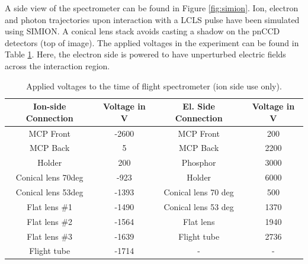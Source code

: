 A side view of the spectrometer can be found in Figure \ref{fig:simion}. Ion, electron and photon trajectories upon interaction with a LCLS pulse have been simulated using SIMION. A conical lens stack avoids casting a shadow on the pnCCD detectors (top of image). The applied voltages in the experiment can be found in Table \ref{tab:tof-volategs}. Here, the electron side is powered to have unperturbed electric fields across the interaction region.
\begin{table}
\centering
\begin{tabular}{ | c | c || c | c | }
\hline
	\textbf{Ion-side Connection} & \textbf{Voltage in V} & \textbf{El. Side Connection} & \textbf{Voltage in V} \\ \hline
	MCP Front & -2600 & MCP Front & 200 \\ \hline
	MCP Back & 5 & MCP Back & 2200 \\ \hline
	Holder & 200 & Phosphor & 3000 \\ \hline
	Conical lens 70deg & -923 & Holder & 6000 \\ \hline
	Conical lens 53deg & -1393 & Conical lens 70 deg & 500 \\ \hline
	Flat lens \#1 & -1490 & Conical lens 53 deg & 1370 \\ \hline
	Flat lens \#2 & -1564 & Flat lens & 1940 \\ \hline
	Flat lens \#3 & -1639 & Flight tube & 2736 \\ \hline
	Flight tube & -1714 & - & - \\ \hline
\end{tabular}
\caption{Applied voltages to the time of flight spectrometer (ion side use only).}
\label{tab:tof-volategs}
\end{table}
%
%
%